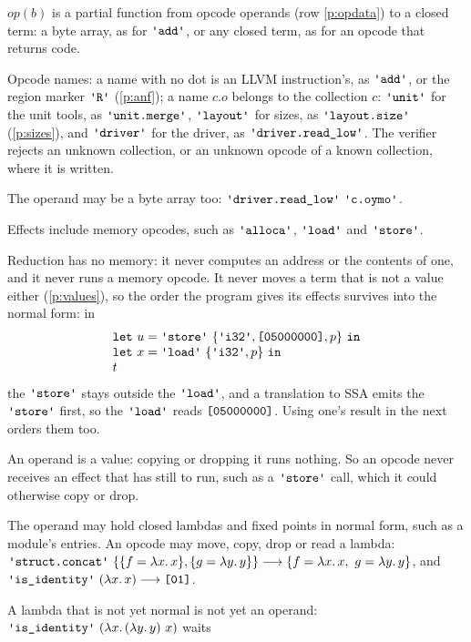 \documentclass[11pt,letterpaper]{article}
\newcommand{\step}{\mathrel{\longrightarrow}}     %
\newcommand{\lam}[2]{\lambda #1.\,#2}       %
\newcommand{\fn}[1]{\mathit{#1}}                %
\newcommand{\kw}[1]{\mathtt{#1}}
\newcommand{\str}[1]{\text{\ttfamily\textquotesingle #1\textquotesingle}}  %
\newcommand{\hex}[1]{\text{\ttfamily [#1]}}  %
\newcommand{\pref}[1]{\ref{#1}}  %
\begin{document}
\begin{points}
  \begin{subpoints}
  \item $\fn{op}(b)$ is a partial function from opcode operands (row \pref{p:opdata}) to a closed term: a byte
    array, as for $\str{add}$, or any closed term, as for an opcode that returns code.
  \item\label{p:opcode-names}Opcode names: a name with no dot is an LLVM instruction's, as $\str{add}$, or the
    region marker $\str{R}$ (\pref{p:anf}); a name $c.o$ belongs to the collection $c$: $\str{unit}$ for the unit
    tools, as $\str{unit.merge}$, $\str{layout}$ for sizes, as $\str{layout.size}$ (\pref{p:sizes}), and $\str{driver}$ for the driver, as $\str{driver.read\_low}$. The verifier rejects an
    unknown collection, or an unknown opcode of a known collection, where it is written.
  \item The operand may be a byte array too: $\str{driver.read\_low}\ \str{c.oymo}$.
  \item Effects include memory opcodes, such as $\str{alloca}$, $\str{load}$ and $\str{store}$.
  \item Reduction has no memory: it never computes an address or the contents of
    one, and it never runs a memory opcode. It never moves a term that is not a value either
    (\pref{p:values}), so the order the program gives its effects survives into the normal form: in
    \[\begin{array}{l}\kw{let}\ u = \str{store}\ \{\str{i32}, \hex{05000000}, p\}\ \kw{in} \\
    \kw{let}\ x = \str{load}\ \{\str{i32}, p\}\ \kw{in} \\
    t\end{array}\]
    the $\str{store}$ stays outside the $\str{load}$, and a translation to SSA emits the $\str{store}$
    first, so the $\str{load}$ reads $\hex{05000000}$. Using one's result in the next orders them too.
  \item An operand is a value: copying or dropping it runs nothing. So an opcode never receives an
    effect that has still to run, such as a $\str{store}$ call, which it could otherwise copy or drop.
  \item The operand may hold closed lambdas and fixed points in normal form, such as a module's entries. An opcode may move, copy,
    drop or read a lambda:
    $\str{struct.concat}\ \{\{f = \lam{x}{x}\}, \{g = \lam{y}{y}\}\} \step \{f = \lam{x}{x},\ g = \lam{y}{y}\}$, and $\str{is\_identity}\ (\lam{x}{x}) \step \hex{01}$.
  \item A lambda that is not yet normal is not yet an operand: $\str{is\_identity}\ (\lam{x}{(\lam{y}{y})\ x})$ waits

\end{subpoints}
\end{points}
\end{document}
